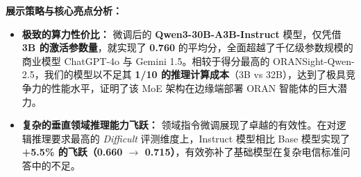 \documentclass[11pt, a4paper]{article}
\begin{document}
\vspace{1cm}

\noindent \textbf{展示策略与核心亮点分析：} \\
\begin{itemize}
    \item \textbf{极致的算力性价比：} 微调后的 \textbf{Qwen3-30B-A3B-Instruct} 模型，仅凭借 \textbf{3B 的激活参数量}，就实现了 \textbf{0.760} 的平均分，全面超越了千亿级参数规模的商业模型 ChatGPT-4o 与 Gemini 1.5。相较于得分最高的 ORANSight-Qwen-2.5，我们的模型以不足其 \textbf{1/10 的推理计算成本}（3B vs 32B），达到了极具竞争力的性能水平，证明了该 MoE 架构在边缘端部署 ORAN 智能体的巨大潜力。
    \item \textbf{复杂的垂直领域推理能力飞跃：} 领域指令微调展现了卓越的有效性。在对逻辑推理要求最高的 \textit{Difficult} 评测维度上，Instruct 模型相比 Base 模型实现了 \textbf{+5.5\% 的飞跃（0.660 $\rightarrow$ 0.715）}，有效弥补了基础模型在复杂电信标准问答中的不足。
\end{itemize}
\end{document}
